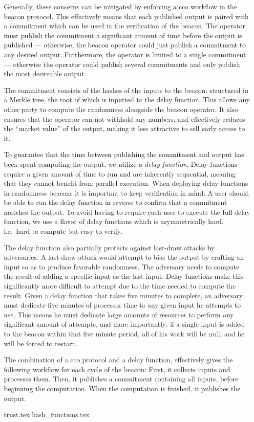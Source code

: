 Generally, these concerns can be mitigated by enforcing a \gls{cco} workflow in the beacon protocol.
This effectively means that each published output is paired with a commitment which can be used in the verification of the beacon.
The operator must publish the commitment a significant amount of time before the output is published --- otherwise, the beacon operator could just publish a commitment to any desired output. Furthermore, the operator is limited to a single commitment --- otherwise the operator could publish several commitments and only publish the most desireable output.

The commitment consists of the hashes of the inputs to the beacon, structured in a Merkle tree, the root of which is inputted to the delay function. This allows any other party to compute the randomness alongside the beacon operator. It also ensures that the operator can not withhold any numbers, and effectively reduces the \enquote{market value} of the output, making it less attractive to sell early access to it.

To guarantee that the time between publishing the commitment and output has been spent computing the output, we utilize a \emph{delay function}.
Delay functions require a given amount of time to run and are inherently sequential, meaning that they cannot benefit from parallel execution.
When deploying delay functions in randomness beacons it is important to keep verification in mind.
A user should be able to run the delay function in reverse to confirm that a commitment matches the output.
To avoid having to require each user to execute the full delay function, we use a flavor of delay functions which is asymmetrically hard, i.e.\ hard to compute but easy to verify.

The delay function also partially protects against last-draw attacks by adversaries. A last-draw attack would attempt to bias the output by crafting an input so as to produce favorable randomness. The adversary needs to compute the result of adding a specific input as the last input. Delay functions make this significantly more difficult to attempt due to the time needed to compute the result.
Given a delay function that takes five minutes to complete, an adversary must dedicate five minutes of processor time to any given input he attempts to use. This means he must dedicate large amounts of resources to perform any significant amount of attempts, and more importantly: if a single input is added to the beacon within that five minute period, all of his work will be null, and he will be forced to restart.

The combination of a \gls{cco} protocol and a delay function, effectively gives the following workflow for each cycle of the beacon: First, it collects inputs and processes them. Then, it publishes a commitment containing all inputs, before beginning the computation. When the computation is finished, it publishes the output.

{trust.tex}
{hash_functions.tex}

